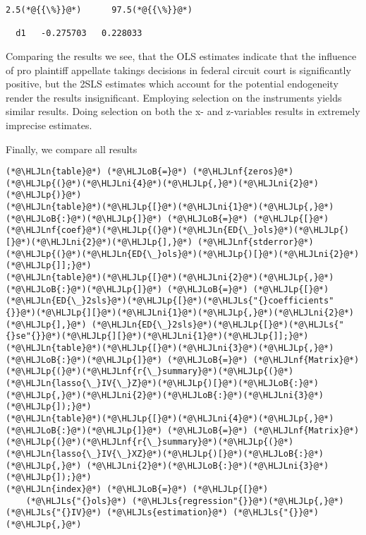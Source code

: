 \documentclass[12pt,a4paper]{article}
\newcommand{\HLJLn}[1]{#1}
\newcommand{\HLJLnf}[1]{\textcolor[RGB]{66,102,213}{#1}}
\newcommand{\HLJLs}[1]{\textcolor[RGB]{201,61,57}{#1}}
\newcommand{\HLJLni}[1]{\textcolor[RGB]{59,151,46}{#1}}
\newcommand{\HLJLoB}[1]{\textcolor[RGB]{102,102,102}{\textbf{#1}}}
\newcommand{\HLJLp}[1]{#1}
\begin{document}
\begin{lstlisting}
2.5(*@{{\%}}@*)      97.5(*@{{\%}}@*)

  d1   -0.275703   0.228033
\end{lstlisting}


Comparing the results we see, that the OLS estimates indicate that the influence of pro plaintiff appellate takings decisions in federal circuit court is significantly positive, but the 2SLS estimates which account for the potential endogeneity render the results insignificant. Employing selection on the instruments yields similar results. Doing selection on both the x- and z-variables results in extremely imprecise estimates.

Finally, we compare all results


\begin{lstlisting}
(*@\HLJLn{table}@*) (*@\HLJLoB{=}@*) (*@\HLJLnf{zeros}@*)(*@\HLJLp{(}@*)(*@\HLJLni{4}@*)(*@\HLJLp{,}@*)(*@\HLJLni{2}@*)(*@\HLJLp{)}@*)
(*@\HLJLn{table}@*)(*@\HLJLp{[}@*)(*@\HLJLni{1}@*)(*@\HLJLp{,}@*)(*@\HLJLoB{:}@*)(*@\HLJLp{]}@*) (*@\HLJLoB{=}@*) (*@\HLJLp{[}@*)(*@\HLJLnf{coef}@*)(*@\HLJLp{(}@*)(*@\HLJLn{ED{\_}ols}@*)(*@\HLJLp{)[}@*)(*@\HLJLni{2}@*)(*@\HLJLp{],}@*) (*@\HLJLnf{stderror}@*)(*@\HLJLp{(}@*)(*@\HLJLn{ED{\_}ols}@*)(*@\HLJLp{)[}@*)(*@\HLJLni{2}@*)(*@\HLJLp{]];}@*)
(*@\HLJLn{table}@*)(*@\HLJLp{[}@*)(*@\HLJLni{2}@*)(*@\HLJLp{,}@*)(*@\HLJLoB{:}@*)(*@\HLJLp{]}@*) (*@\HLJLoB{=}@*) (*@\HLJLp{[}@*)(*@\HLJLn{ED{\_}2sls}@*)(*@\HLJLp{[}@*)(*@\HLJLs{"{}coefficients"{}}@*)(*@\HLJLp{][}@*)(*@\HLJLni{1}@*)(*@\HLJLp{,}@*)(*@\HLJLni{2}@*)(*@\HLJLp{],}@*) (*@\HLJLn{ED{\_}2sls}@*)(*@\HLJLp{[}@*)(*@\HLJLs{"{}se"{}}@*)(*@\HLJLp{][}@*)(*@\HLJLni{1}@*)(*@\HLJLp{]];}@*)
(*@\HLJLn{table}@*)(*@\HLJLp{[}@*)(*@\HLJLni{3}@*)(*@\HLJLp{,}@*)(*@\HLJLoB{:}@*)(*@\HLJLp{]}@*) (*@\HLJLoB{=}@*) (*@\HLJLnf{Matrix}@*)(*@\HLJLp{(}@*)(*@\HLJLnf{r{\_}summary}@*)(*@\HLJLp{(}@*)(*@\HLJLn{lasso{\_}IV{\_}Z}@*)(*@\HLJLp{)[}@*)(*@\HLJLoB{:}@*)(*@\HLJLp{,}@*)(*@\HLJLni{2}@*)(*@\HLJLoB{:}@*)(*@\HLJLni{3}@*)(*@\HLJLp{]);}@*)
(*@\HLJLn{table}@*)(*@\HLJLp{[}@*)(*@\HLJLni{4}@*)(*@\HLJLp{,}@*) (*@\HLJLoB{:}@*)(*@\HLJLp{]}@*) (*@\HLJLoB{=}@*) (*@\HLJLnf{Matrix}@*)(*@\HLJLp{(}@*)(*@\HLJLnf{r{\_}summary}@*)(*@\HLJLp{(}@*)(*@\HLJLn{lasso{\_}IV{\_}XZ}@*)(*@\HLJLp{)[}@*)(*@\HLJLoB{:}@*)(*@\HLJLp{,}@*) (*@\HLJLni{2}@*)(*@\HLJLoB{:}@*)(*@\HLJLni{3}@*)(*@\HLJLp{]);}@*)
(*@\HLJLn{index}@*) (*@\HLJLoB{=}@*) (*@\HLJLp{[}@*)
    (*@\HLJLs{"{}ols}@*) (*@\HLJLs{regression"{}}@*)(*@\HLJLp{,}@*) (*@\HLJLs{"{}IV}@*) (*@\HLJLs{estimation}@*) (*@\HLJLs{"{}}@*)(*@\HLJLp{,}@*) 

\end{lstlisting}
\end{document}
